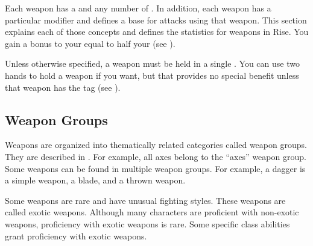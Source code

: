 \newpage
{}

  Each weapon has a  and any number of .
  In addition, each weapon has a particular  modifier and defines a base  for attacks using that weapon.
  This section explains each of those concepts and defines the statistics for weapons in Rise.
  You gain a bonus to your  equal to half your  (see ).

  Unless otherwise specified, a weapon must be held in a single .
  You can use two hands to hold a weapon if you want, but that provides no special benefit unless that weapon has the  tag (see ).

  \subsection{Weapon Groups}\label{Weapon Groups}
    Weapons are organized into thematically related categories called weapon groups. They are described in . For example, all axes belong to the ``axes'' weapon group. Some weapons can be found in multiple weapon groups. For example, a dagger is a simple weapon, a blade, and a thrown weapon.

     Some weapons are rare and have unusual fighting styles.
    These weapons are called exotic weapons.
    Although many characters are proficient with non-exotic weapons, proficiency with exotic weapons is rare.
    Some specific class abilities grant proficiency with exotic weapons.


